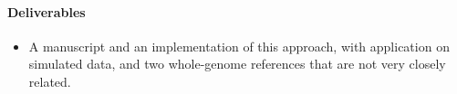 \paragraph{Deliverables}
\begin{itemize}
\item A manuscript and an implementation of this approach, with application on simulated data, and two whole-genome references that are not very closely related. 
\end{itemize}













